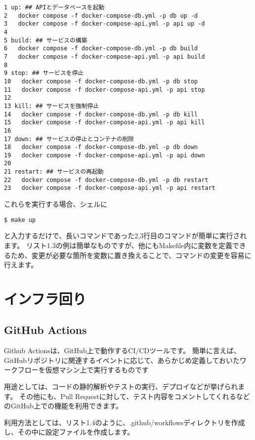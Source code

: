 \begin{tcolorbox}[title=リスト1.3 Makefile]
  \begin{verbatim}
1 up: ## APIとデータベースを起動
2   docker compose -f docker-compose-db.yml -p db up -d
3   docker compose -f docker-compose-api.yml -p api up -d
4 
5 build: ## サービスの構築
6   docker compose -f docker-compose-db.yml -p db build
7   docker compose -f docker-compose-api.yml -p api build
8 
9 stop: ## サービスを停止
10   docker compose -f docker-compose-db.yml -p db stop
11   docker compose -f docker-compose-api.yml -p api stop
12 
13 kill: ## サービスを強制停止
14   docker compose -f docker-compose-db.yml -p db kill
15   docker compose -f docker-compose-api.yml -p api kill
16 
17 down: ## サービスの停止とコンテナの削除
18   docker compose -f docker-compose-db.yml -p db down
19   docker compose -f docker-compose-api.yml -p api down
20 
21 restart: ## サービスの再起動
22   docker compose -f docker-compose-db.yml -p db restart
23   docker compose -f docker-compose-api.yml -p api restart
 \end{verbatim}
\end{tcolorbox}

これらを実行する場合、シェルに
\begin{shaded}
  \begin{verbatim}
$ make up
\end{verbatim}
\end{shaded}
と入力するだけで、長いコマンドであった2,3行目のコマンドが簡単に実行されます。
リスト1.3の例は簡単なものですが、他にもMakefile内に変数を定義できるため、変更が必要な箇所を変数に置き換えることで、コマンドの変更を容易に行えます。

\section{インフラ回り}

\subsection{GitHub Actions}
Github Actionsは、GitHub上で動作するCI/CDツールです。
簡単に言えば、GitHubリポジトリに関連するイベントに応じて、あらかじめ定義しておいたワークフローを仮想マシン上で実行するものです

用途としては、コードの静的解析やテストの実行、デプロイなどが挙げられます。
その他にも、Pull Requestに対して、テスト内容をコメントしてくれるなどのGitHub上での機能を利用できます。

利用方法としては、リスト1.4のように、.github/workflowsディレクトリを作成し、その中に設定ファイルを作成します。

